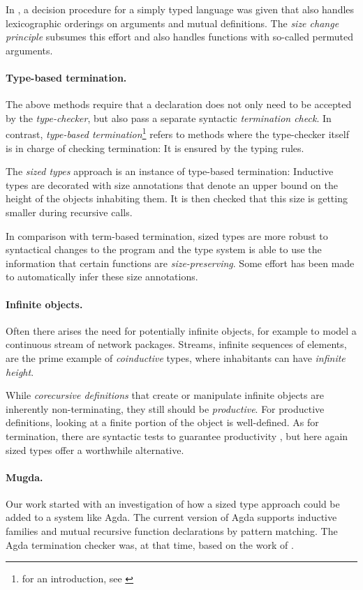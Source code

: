 In \cite{abelAltenkirch:predStRec}, a decision procedure for a simply typed language was given that also handles lexicographic orderings on arguments and mutual definitions.
The \emph{size change principle} \cite{lee01sizechange} subsumes this effort and also handles functions with so-called permuted arguments.

\paragraph*{Type-based termination.}
The above methods require that a declaration does not only need to be accepted by the \emph{type-checker}, but also pass a separate syntactic \emph{termination check}.
In contrast, \emph{type-based termination}\footnote{for an introduction, see \cite{abel:PhD}} refers to methods where the type-checker itself is in charge of checking termination: It is ensured by the typing rules.

The \emph{sized types} approach is an instance of type-based termination:
Inductive types are decorated with size annotations that denote an upper bound on the height of the objects inhabiting them.
It is then checked that this size is getting smaller during recursive calls.

In comparison with term-based termination, sized types are more robust to syntactical changes to the program and the type system is able to use the information that certain functions are \emph{size-preserving}.
Some effort \cite{bgp:lpar06} has been made to automatically infer these size annotations.

\paragraph{Infinite objects.}
Often there arises the need for potentially infinite objects, for example to model a continuous stream of network packages.
Streams, infinite sequences of elements, are the prime example of \emph{coinductive} types, where inhabitants can have
\emph{infinite height}.

While \emph{corecursive definitions} that create or manipulate infinite objects are inherently non-terminating, they still should be \emph{productive}. For productive definitions, looking at a finite portion of the object is well-defined.
As for termination, there are syntactic tests to guarantee productivity \cite{coquand-infinite}, but here again sized types offer a worthwhile alternative.

\paragraph*{Mugda.}
Our work started with an investigation of how a sized type approach could be added to a system like Agda.
The current version of Agda supports inductive families and mutual recursive function declarations by pattern matching.
The Agda termination checker was, at that time, based on the work of \cite{abelAltenkirch:predStRec}.

